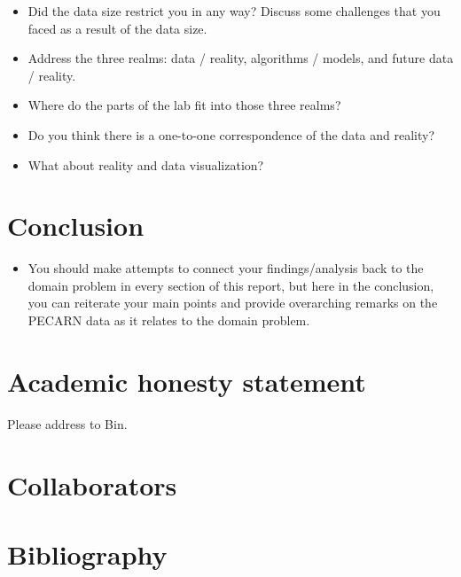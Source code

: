 \documentclass[11pt,letterpaper]{article}
\begin{document}
\begin{itemize}
\item Did the data size restrict you in any way? Discuss some challenges that you faced as a result of the data size.
\item Address the three realms: data / reality, algorithms / models, and future data / reality.
\item Where do the parts of the lab fit into those three realms?
\item Do you think there is a one-to-one correspondence of the data and reality?
\item What about reality and data visualization?
\end{itemize}


\section{Conclusion}\label{conclusion}

\begin{itemize}
\item You should make attempts to connect your findings/analysis back to the domain problem in every section of this report, but here in the conclusion, you can reiterate your main points and provide overarching remarks on the PECARN data as it relates to the domain problem.
\end{itemize}

\section{Academic honesty statement}\label{academic-honesty-statement}

Please address to Bin.

\section{Collaborators}\label{collaborators}

\section{Bibliography}\label{bibliography}
\end{document}
